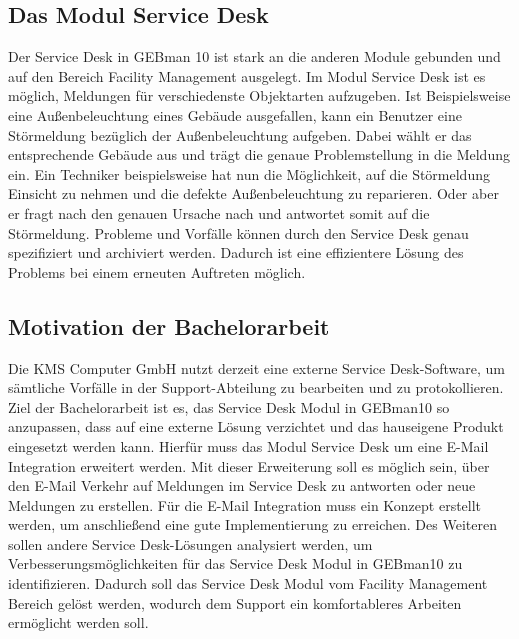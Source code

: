 \subsection{Das Modul Service Desk}
\noindent
Der Service Desk in GEBman 10 ist stark an die anderen Module gebunden und auf den Bereich Facility Management ausgelegt. Im Modul Service Desk ist es möglich, Meldungen für verschiedenste Objektarten aufzugeben. Ist Beispielsweise eine Außenbeleuchtung eines Gebäude ausgefallen, kann ein Benutzer eine Störmeldung bezüglich der Außenbeleuchtung aufgeben. Dabei wählt er das entsprechende Gebäude aus und trägt die genaue Problemstellung in die Meldung ein. Ein Techniker beispielsweise hat nun die Möglichkeit, auf die Störmeldung Einsicht zu nehmen und die defekte Außenbeleuchtung zu reparieren. Oder aber er fragt nach den genauen Ursache nach und antwortet somit auf die Störmeldung. Probleme und Vorfälle können durch den Service Desk genau spezifiziert und archiviert werden. Dadurch ist eine effizientere Lösung des Problems bei einem erneuten Auftreten möglich.


\subsection{Motivation der Bachelorarbeit}
\noindent
Die KMS Computer GmbH nutzt derzeit eine externe Service Desk-Software, um sämtliche Vorfälle in der Support-Abteilung zu bearbeiten und zu protokollieren. Ziel der Bachelorarbeit ist es, das Service Desk Modul in GEBman10 so anzupassen, dass auf eine externe Lösung verzichtet und das hauseigene Produkt eingesetzt werden kann. Hierfür muss das Modul Service Desk um eine E-Mail Integration erweitert werden. Mit dieser Erweiterung soll es möglich sein, über den E-Mail Verkehr auf Meldungen im Service Desk zu antworten oder neue Meldungen zu erstellen. Für die E-Mail Integration muss ein Konzept erstellt werden, um anschließend eine gute Implementierung zu erreichen.\newline
Des Weiteren sollen andere Service Desk-Lösungen analysiert werden, um Verbesserungsmöglichkeiten für das Service Desk Modul in GEBman10 zu identifizieren. Dadurch soll das Service Desk Modul vom Facility Management Bereich gelöst werden, wodurch dem Support ein komfortableres Arbeiten ermöglicht werden soll.


